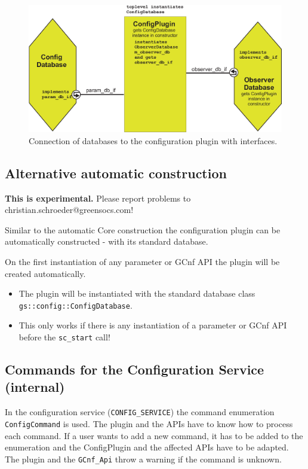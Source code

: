 \begin{figure}[htb]
	\centerline{
		\includegraphics[width=\textwidth]{ConfigPlugin_Ports.eps}}
	\caption{Connection of databases to the configuration plugin with interfaces.}
	\label{fig:ConfigPluginDatabaseConnection}
\end{figure}


\subsection{Alternative automatic construction}
\label{GCnfAutomaticConstruction}

 \textbf{This is experimental.} Please report problems to christian.schroeder@greensocs.com!

Similar to the automatic \GreenControl Core construction the configuration plugin can be automatically constructed - with its standard database.

On the first instantiation of any parameter or GCnf API the plugin will be created automatically.

\begin{itemize}
  \item The plugin will be instantiated with the standard database class \lstinline|gs::config::ConfigDatabase|.
  \item This only works if there is any instantiation of a parameter or GCnf API before the \lstinline|sc_start| call!
\end{itemize}


\subsection{Commands for the Configuration Service (internal)}
\label{CommandsConfigService}

In the configuration service (\lstinline|CONFIG_SERVICE|) the command enumeration \lstinline|ConfigCommand| is used. The plugin and the APIs have to know how to process each command. If a user wants to add a new command, it has to be added to the enumeration and the ConfigPlugin and the affected APIs have to be adapted. The plugin and the \lstinline|GCnf_Api|  throw a warning if the command is unknown.

